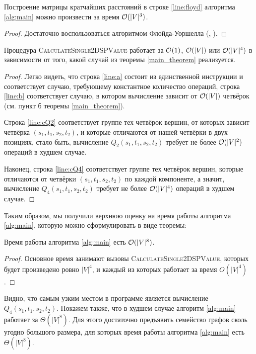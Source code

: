 \begin{proposition}
Построение матрицы кратчайших расстояний в строке \ref{line:floyd} алгоритма \ref{alg:main} можно произвести за время $\mathcal{O}(|V|^3)$.
\end{proposition}
\begin{proof}
Достаточно воспользоваться алгоритмом Флойда-Уоршелла (\cite{Floyd}, \cite{CLRS}).
\end{proof}

\begin{proposition}
Процедура \textsc{CalculateSingle2DSPValue} работает за $\mathcal{O}(1)$, $\mathcal{O}(|V|)$ или $\mathcal{O}(|V|^4)$ в зависимости от того, какой случай из теоремы \ref{main_theorem} реализуется.
\end{proposition}
\begin{proof}
Легко видеть, что строка \ref{line:a} состоит из единственной инструкции и соответствует случаю, требующему константное количество операций, строка \ref{line:b} соответствует случаю, в котором вычисление зависит от $\mathcal{O}(|V|)$ четвёрок (см. пункт б теоремы \ref{main_theorem}). 

Строка \ref{line:cQ2} соответствует группе тех четвёрок вершин, от которых зависит четвёрка $(s_1, t_1, s_2, t_2)$, и которые отличаются от нашей четвёрки в двух позициях, стало быть, вычисление $Q_2(s_1, t_1, s_2, t_2)$ требует не более $\mathcal{O}(|V|^2)$ операций в худшем случае.

Наконец, строка \ref{line:cQ4} соответствует группе тех четвёрок вершин, которые отличаются от четвёрки $(s_1, t_1, s_2, t_2)$ по каждой компоненте, а значит, вычисление $Q_4(s_1, t_1, s_2, t_2)$ требует не более $\mathcal{O}(|V|^4)$ операций в худшем случае.
\end{proof}

Таким образом, мы получили верхнюю оценку на время работы алгоритма \ref{alg:main}, которую можно сформулировать в виде теоремы:

\begin{theorem}
Время работы алгоритма \ref{alg:main} есть $\mathcal{O}(|V|^8)$.
\end{theorem}
\begin{proof}
Основное время занимают вызовы \textsc{CalculateSingle2DSPValue}, которых будет произведено ровно $|V|^4$, и каждый из которых работает за время $O(|V|^4)$.
\end{proof}

Видно, что самым узким местом в программе является вычисление $Q_4(s_1, t_1, s_2, t_2)$. Покажем также, что в худшем случае алгоритм \ref{alg:main} работает за $\Theta(|V|^8)$. Для этого достаточно предъявить семейство графов сколь угодно большого размера, для которых время работы алгоритма \ref{alg:main} есть $\Theta(|V|^8)$.

